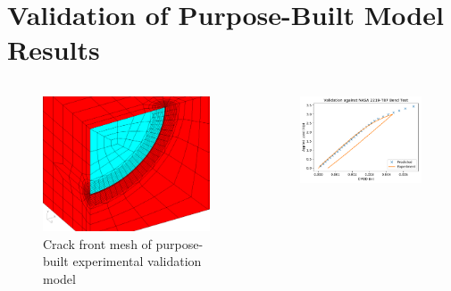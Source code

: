 \section{Validation of Purpose-Built Model Results}

\begin{frame}
\begin{columns}
\begin{column}{0.45\textwidth}
\begin{figure}[tbp]
\centering
\includegraphics[width=\columnwidth]{exp_validation_mesh_zoomed}
\caption{Crack front mesh of purpose-built experimental validation model}
\end{figure}
\end{column}
\begin{column}{0.45\textwidth}
\begin{figure}[tbp]
\centering
\includegraphics[width=\columnwidth]{experimental-validation-load-cmod}

\end{figure}
\end{column}
\end{columns}
\end{frame}
